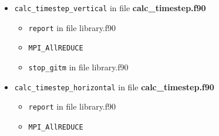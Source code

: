 \begin{itemize}
\begin{itemize}
  \item {\tt calc\_timestep\_vertical}   in file {\bf calc\_timestep.f90}
    \begin{itemize}
      \item {\tt report} in file library.f90
      \item {\tt MPI\_AllREDUCE}
      \item {\tt stop\_gitm} in file library.f90
    \end{itemize}


  \item {\tt calc\_timestep\_horizontal}   in file {\bf calc\_timestep.f90}
    \begin{itemize}
      \item {\tt report} in file library.f90
      \item {\tt MPI\_AllREDUCE}
    \end{itemize}



\end{itemize}
\end{itemize}
